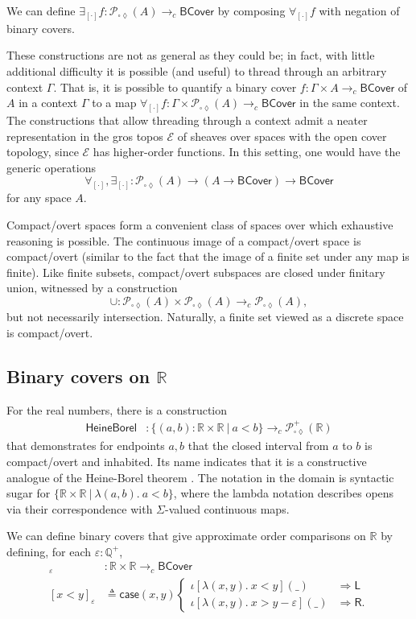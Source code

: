 \documentclass[conference]{IEEEtran}
\newcommand{\Viet}{\mathcal{P}_{\square\lozenge}}
\newcommand{\cto}{\to_c}
\newcommand{\R}{\mathbb{R}}
\newcommand{\rat}{\mathbb{Q}}
\newcommand{\fun}[2]{\lambda {#1}.\  {#2}}
\newcommand{\suchthat}{\ |\ }
\newcommand{\wildcard}{\_}
\newcommand{\oinclf}[1]{\iota[{#1}]}
\newcommand{\oincl}[2]{\oinclf{#1} \left({#2}\right)}
\newcommand{\Branch}{\Rightarrow}
\newcommand{\BCover}{\mathsf{BCover}}
\begin{document}
We can define $\exists_{[\cdot]} f : \Viet(A) \cto \BCover$ by composing $\forall_{[\cdot]} f$ with negation of binary covers.

These constructions are not as general as they could be; in fact, with little additional difficulty it is possible (and useful) to thread through an arbitrary context $\Gamma$. That is, it is possible to quantify a binary cover $f : \Gamma \times A \cto \BCover$ of $A$ in a context $\Gamma$ to a map $\forall_{[\cdot]}f : \Gamma \times \Viet(A) \cto \BCover$ in the same context. The constructions that allow threading through a context admit a neater representation in the gros topos $\mathcal{E}$ of sheaves over spaces with the open cover topology, since $\mathcal{E}$ has higher-order functions. In this setting, one would have the generic operations 
\[
\forall_{[\cdot]}, \exists_{[\cdot]} : \Viet(A) \to (A \to \BCover) \to \BCover
\]
for any space $A$.

Compact/overt spaces form a convenient class of spaces over which exhaustive reasoning is possible. The continuous image of a compact/overt space is compact/overt (similar to the fact that the image of a finite set under any map is finite). Like finite subsets, compact/overt subspaces are closed under finitary union, witnessed by a construction
\[
\cup : \Viet(A) \times \Viet(A) \cto \Viet(A),
\]
but not necessarily intersection. Naturally, a finite set viewed as a discrete space is compact/overt.

\subsection{Binary covers on $\R$}

For the real numbers, there is a construction
\begin{align*}
\mathsf{HeineBorel} &: \{ (a, b) : \R \times \R \suchthat a < b \} \cto \Viet^+(\R)
\end{align*}
that demonstrates for endpoints $a, b$ that the closed interval from $a$ to $b$ is compact/overt and inhabited. Its name indicates that it is a constructive analogue of the Heine-Borel theorem \cite{vickersmetric2}. The notation in the domain is syntactic sugar for $\{ \R \times \R \suchthat \fun{(a,b)}{a < b} \}$, where the lambda notation describes opens via their correspondence with $\Sigma$-valued continuous maps.

We can define binary covers that give approximate order comparisons on $\R$ by defining, for each $\varepsilon : \rat^+$,
\begin{align*}
[ \cdot < \cdot ]_\varepsilon &: \R \times \R \cto \BCover
\\ [x < y]_\varepsilon &\triangleq \mathsf{case}(x, y)
\begin{cases}
\oincl{\fun{(x, y)}{x < y}}{\wildcard} &\Branch \mathsf{L}
\\ \oincl{\fun{(x, y)}{x > y - \varepsilon}}{\wildcard} &\Branch \mathsf{R}.
\end{cases}
\end{align*}
\end{document}
